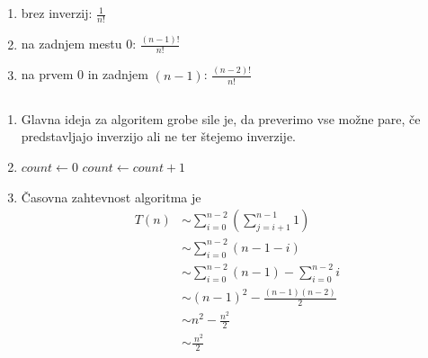 \documentclass[11pt,a4paper]{article}
\theoremstyle{plain}
\theoremstyle{definition}
\begin{document}
\subsection{}

\begin{enumerate}[label=\alph*)]
\item brez inverzij: $\frac{1}{n!}$
\item na zadnjem mestu 0: $\frac{(n-1)!}{n!}$
\item na prvem 0 in zadnjem $(n-1)$: $\frac{(n-2)!}{n!}$
\end{enumerate}

\subsection{}

\begin{enumerate}[label=\alph*)]
\item
Glavna ideja za algoritem grobe sile je, da preverimo vse možne pare, če predstavljajo inverzijo ali ne ter štejemo inverzije.

\item
\begin{algorithmic}
\State $count \gets 0$
            \State $count \gets count + 1$
        \EndIf
    \EndFor
\EndFor
{}
\end{algorithmic}

\item
Časovna zahtevnost algoritma je
\begin{align*}
T(n) &\sim \sum_{i=0}^{n-2} \left( \sum_{j=i+1}^{n-1} 1 \right) \\
     &\sim \sum_{i=0}^{n-2} \left( n - 1 - i \right) \\
     &\sim \sum_{i=0}^{n-2} \left( n-1 \right) - \sum_{i=0}^{n-2} i \\
     &\sim (n-1)^2 - \frac{(n-1) (n-2)}{2} \\
     &\sim n^2 - \frac{n^2}{2} \\
     &\sim \frac{\ n^2}{2}
\end{align*}

\end{enumerate}

\subsection{}
\end{document}
